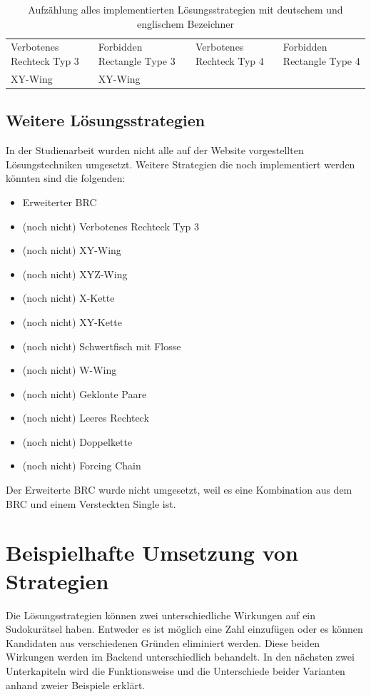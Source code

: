 \begin{table}[H]
{\begin{tabular}{|ll|lll}
			Verbotenes Rechteck Typ 3         & Forbidden Rectangle Type 3 & \multicolumn{1}{l|}{} & Verbotenes Rechteck Typ 4        & \multicolumn{1}{l|}{Forbidden Rectangle Type 4} \\
			XY-Wing                           & XY-Wing                    &                       &                                  &                                                
		\end{tabular}%
	}
	\caption{Aufzählung alles implementierten Lösungsstrategien mit deutschem und englischem Bezeichner}
	\label{tab:implStrategien}
\end{table}

\subsection{Weitere Lösungsstrategien}
In der Studienarbeit wurden nicht alle auf der Website \cite{martin} vorgestellten Lösungstechniken umgesetzt. Weitere Strategien die noch implementiert werden könnten sind die folgenden:
\begin{itemize}
	\item Erweiterter \ac{BRC}
	\item (noch nicht) Verbotenes Rechteck Typ 3
	\item (noch nicht) XY-Wing
	\item (noch nicht) XYZ-Wing
	\item (noch nicht) X-Kette
	\item (noch nicht) XY-Kette
	\item (noch nicht) Schwertfisch mit Flosse
	\item (noch nicht) W-Wing
	\item (noch nicht) Geklonte Paare
	\item (noch nicht) Leeres Rechteck
	\item (noch nicht) Doppelkette
	\item (noch nicht) Forcing Chain
\end{itemize}
Der Erweiterte \ac{BRC} wurde nicht umgesetzt, weil es eine Kombination aus dem \ac{BRC} und einem Versteckten Single ist. 

\section{Beispielhafte Umsetzung von Strategien}
Die Lösungsstrategien können zwei unterschiedliche Wirkungen auf ein Sudokurätsel haben. Entweder es ist möglich eine Zahl einzufügen oder es können Kandidaten aus verschiedenen Gründen eliminiert werden. Diese beiden Wirkungen werden im Backend unterschiedlich behandelt. In den nächsten zwei Unterkapiteln wird die Funktionsweise und die Unterschiede beider Varianten anhand zweier Beispiele erklärt. 

